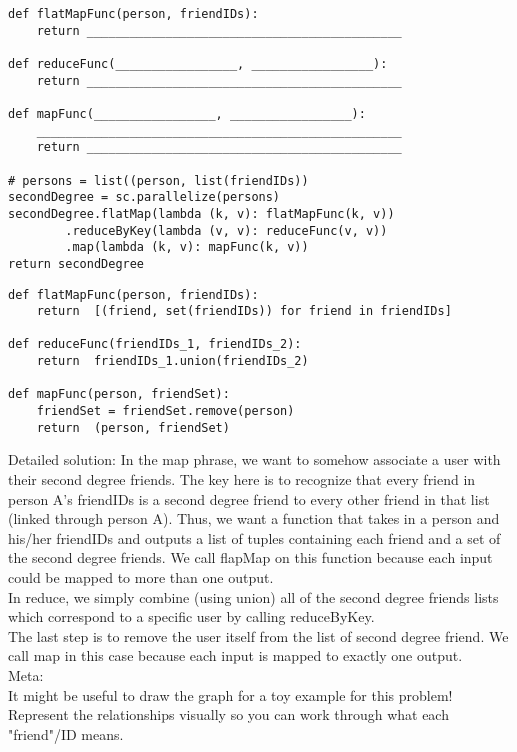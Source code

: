\begin{blocksection}
\begin{verbatim}
def flatMapFunc(person, friendIDs): 
    return ____________________________________________

def reduceFunc(_________________, _________________): 
    return ____________________________________________

def mapFunc(_________________, _________________): 
    ___________________________________________________
    return ____________________________________________

# persons = list((person, list(friendIDs))
secondDegree = sc.parallelize(persons)
secondDegree.flatMap(lambda (k, v): flatMapFunc(k, v))
        .reduceByKey(lambda (v, v): reduceFunc(v, v))
        .map(lambda (k, v): mapFunc(k, v))
return secondDegree
\end{verbatim}

\begin{solution}
\begin{verbatim}
def flatMapFunc(person, friendIDs): 
    return  [(friend, set(friendIDs)) for friend in friendIDs]

def reduceFunc(friendIDs_1, friendIDs_2): 
    return  friendIDs_1.union(friendIDs_2)

def mapFunc(person, friendSet): 
    friendSet = friendSet.remove(person)
    return  (person, friendSet)
\end{verbatim}
    
Detailed solution:
In the map phrase, we want to somehow associate a user with their second degree friends. The key here is to recognize that every friend in person A’s friendIDs is a second degree friend to every other friend in that list (linked through person A). Thus, we want a function that takes in a person and his/her friendIDs and outputs a list of tuples containing each friend and a set of the second degree friends. We call flapMap on this function because each input could be mapped to more than one output.\\
In reduce, we simply combine (using union) all of the second degree friends lists which correspond to a specific user by calling reduceByKey. \\
The last step is to remove the user itself from the list of second degree friend. We call map in this case because each input is mapped to exactly one output.\\
Meta: \\
It might be useful to draw the graph for a toy example for this problem! Represent the relationships visually so you can work through what each "friend"/ID means.
\end{solution}


\end{blocksection}